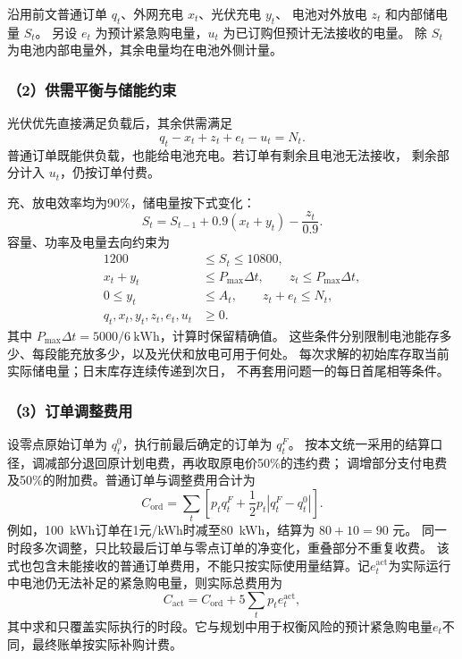 沿用前文普通订单 $q_t$、外网充电 $x_t$、光伏充电 $y_t$、
电池对外放电 $z_t$ 和内部储电量 $S_t$。
另设 $e_t$ 为预计紧急购电量，$u_t$ 为已订购但预计无法接收的电量。
除 $S_t$ 为电池内部电量外，其余电量均在电池外侧计量。

\subsubsection*{（2）供需平衡与储能约束}

光伏优先直接满足负载后，其余供需满足
\begin{equation}
q_t-x_t+z_t+e_t-u_t=N_t.
\end{equation}
普通订单既能供负载，也能给电池充电。若订单有剩余且电池无法接收，
剩余部分计入 $u_t$，仍按订单付费。

充、放电效率均为90\%，储电量按下式变化：
\begin{equation}
S_t=S_{t-1}+0.9(x_t+y_t)-\frac{z_t}{0.9}.
\end{equation}
容量、功率及电量去向约束为
\begin{equation}
\begin{aligned}
1200&\leq S_t\leq10800,\\
x_t+y_t&\leq P_{\max}\Delta t,\qquad z_t\leq P_{\max}\Delta t,\\
0\leq y_t&\leq A_t,\qquad z_t+e_t\leq N_t,\\
q_t,x_t,y_t,z_t,e_t,u_t&\geq0.
\end{aligned}
\end{equation}
其中 $P_{\max}\Delta t=5000/6\ \mathrm{kWh}$，计算时保留精确值。
这些条件分别限制电池能存多少、每段能充放多少，以及光伏和放电可用于何处。
每次求解的初始库存取当前实际储电量；日末库存连续传递到次日，
不再套用问题一的每日首尾相等条件。

\subsubsection*{（3）订单调整费用}

设零点原始订单为 $q_t^0$，执行前最后确定的订单为 $q_t^F$。
按本文统一采用的结算口径，调减部分退回原计划电费，再收取原电价50\%的违约费；
调增部分支付电费及50\%的附加费。普通订单与调整费用合计为
\begin{equation}
C_{\mathrm{ord}}=\sum_t\left[p_tq_t^F+\frac12p_t|q_t^F-q_t^0|\right].
\end{equation}
例如，100~kWh订单在1元/kWh时减至80~kWh，结算为 $80+10=90$ 元。
同一时段多次调整，只比较最后订单与零点订单的净变化，重叠部分不重复收费。
该式也包含未能接收的普通订单费用，不能只按实际使用量结算。记$e_t^{\mathrm{act}}$为实际运行中电池仍无法补足的紧急购电量，则实际总费用为
\[
C_{\mathrm{act}}=C_{\mathrm{ord}}+5\sum_t p_t e_t^{\mathrm{act}},
\]
其中求和只覆盖实际执行的时段。它与规划中用于权衡风险的预计紧急购电量$e_t$不同，最终账单按实际补购计费。

